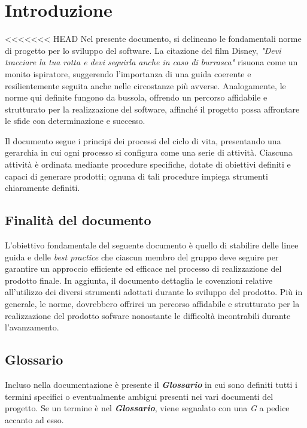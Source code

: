\documentclass{article}
\begin{document}
\pagebreak

\maketitle
\thispagestyle{fancy}
\tableofcontents
{}
\pagebreak


\flushleft
\section{Introduzione}
<<<<<<< HEAD
Nel presente documento, si delineano le fondamentali norme di progetto per lo sviluppo del software. La citazione del film Disney, \emph{"Devi tracciare la tua rotta e devi seguirla anche in caso di burrasca"} risuona come un monito ispiratore, suggerendo l'importanza di una guida coerente e resilientemente seguita anche nelle circostanze più avverse. Analogamente, le norme qui definite fungono da bussola, offrendo un percorso affidabile e strutturato per la realizzazione del software, affinché il progetto possa affrontare le sfide con determinazione e successo.

Il documento segue i principi dei processi del ciclo di vita, presentando una gerarchia in cui ogni processo si configura come una serie di attività. Ciascuna attività è ordinata mediante procedure specifiche, dotate di obiettivi definiti e capaci di generare prodotti; ognuna di tali procedure impiega strumenti chiaramente definiti.

\subsection{Finalità del documento}
L'obiettivo fondamentale del seguente documento è quello di stabilire delle linee guida e delle \textit{best practice} che ciascun membro del gruppo deve seguire per garantire un approccio efficiente ed efficace nel processo di realizzazione del prodotto finale. In aggiunta, il documento dettaglia le covenzioni relative all'utilizzo dei diversi strumenti adottati durante lo sviluppo del prodotto.
Più in generale, le norme, dovrebbero offrirci un percorso affidabile e strutturato per la realizzazione del prodotto sofware nonostante le difficoltà incontrabili durante l'avanzamento.

\subsection{Glossario}
Incluso nella documentazione è presente il \textbf{\textit{Glossario}} in cui sono definiti tutti i termini specifici o eventualmente ambigui presenti nei vari documenti del progetto. Se un termine è nel \textbf{\textit{Glossario}}, viene segnalato con una \textit{G} a pedice accanto ad esso.
\end{document}
